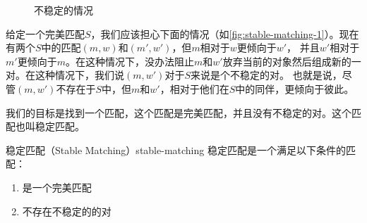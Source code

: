     \begin{wrapfigure}[10]{r}{0.25\linewidth}
        \centering
        \caption{不稳定的情况}
        \label{fig:stable-matching-1}
    \end{wrapfigure}
    给定一个完美匹配$S$，我们应该担心下面的情况（如\autoref{fig:stable-matching-1}）。现在有两个$S$中的匹配$(m,w)$和$(m',w')$，但$m$相对于$w$更倾向于$w'$，
    并且$w'$相对于$m'$更倾向于$m$。在这种情况下，没办法阻止$m$和$w'$放弃当前的对象然后组成新的一对。在这种情况下，我们说$(m,w')$对于$S$来说是个不稳定的对。
    也就是说，尽管$(m,w')$不存在于$S$中，但$m$和$w'$，相对于他们在$S$中的同伴，更倾向于彼此。

    我们的目标是找到一个匹配，这个匹配是完美匹配，并且没有不稳定的对。这个匹配也叫稳定匹配。
    \begin{definition}{稳定匹配（Stable Matching）}{stable-matching}
        稳定匹配是一个满足以下条件的匹配：
        \begin{enumerate}[label=(\roman*)]
            \item 是一个完美匹配
            \item 不存在不稳定的的对
        \end{enumerate}
    \end{definition}

